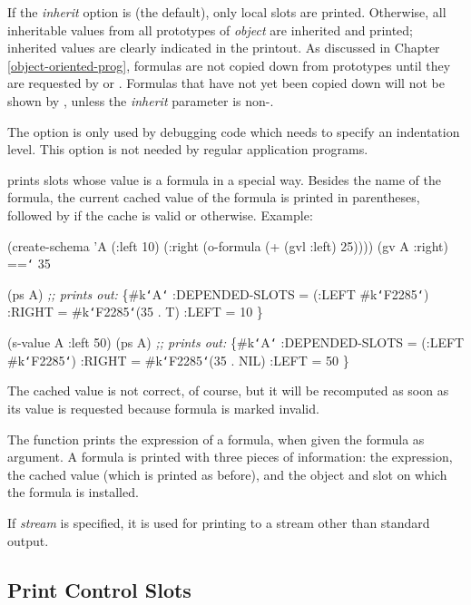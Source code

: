 If the {\it inherit} option is \value{nil} (the default), only local slots
are printed.  Otherwise, all inheritable values from all prototypes of
{\it object} are inherited and printed; inherited values are clearly indicated
in the printout.  As discussed in Chapter \ref{object-oriented-prog}, formulas
are not copied down from prototypes until they are requested by  or
.  Formulas that have not yet been copied down will not be shown
by , unless the {\it inherit} parameter is non-\value{nil}.

The  option is only used by debugging code which needs to
specify an indentation level.  This option is not needed by regular
application programs.

 prints slots whose value is a formula in a special way.  Besides the
name of the formula, the current cached value of the formula is
printed in parentheses, followed by \value{t} if the cache is valid or
\value{nil} otherwise.  Example:
\begin{programexample}
(create-schema 'A
  (:left 10) (:right (o-formula (+ (gvl :left) 25))))
(gv A :right)  =={\tt\char`\>} 35

(ps A)
{\it ;; prints out:}
\{\#k{\tt\char`\<}A{\tt\char`\>}
  :DEPENDED-SLOTS =  (:LEFT \#k{\tt\char`\<}F2285{\tt\char`\>})
  :RIGHT =  \#k{\tt\char`\<}F2285{\tt\char`\>}(35 . T)
  :LEFT =  10
\}
\end{programexample}

\begin{programexample}
(s-value A :left 50)
(ps A)
{\it ;; prints out:}
\{\#k{\tt\char`\<}A{\tt\char`\>}
  :DEPENDED-SLOTS =  (:LEFT \#k{\tt\char`\<}F2285{\tt\char`\>})
  :RIGHT =  \#k{\tt\char`\<}F2285{\tt\char`\>}(35 . NIL)
  :LEFT =  50
\}
\end{programexample}
The cached value is not correct, of course, but it will be recomputed as
soon as its value is requested because formula  is marked invalid.

The function  prints the expression of a formula, when given
the formula as argument.  A formula is printed with three pieces
of information: the expression, the cached value (which is printed as
before), and the object and slot on which the formula is installed.

If {\it stream} is specified, it is used for printing to a stream other than
standard output.


\subsection{Print Control Slots}
\label{print-control-slots}

